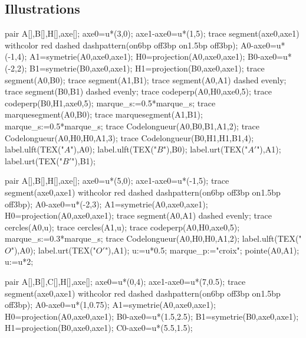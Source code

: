 \begin{changemargin}{0mm}{-15mm}
    \subsection{Illustrations}
    \begin{Geometrie}
        pair A[],B[],H[],axe[];
        axe0=u*(3,0);
        axe1-axe0=u*(1,5);
        trace segment(axe0,axe1) withcolor red dashed dashpattern(on6bp off3bp on1.5bp off3bp);
        A0-axe0=u*(-1,4);
        A1=symetrie(A0,axe0,axe1);
        H0=projection(A0,axe0,axe1);
        B0-axe0=u*(-2,2);
        B1=symetrie(B0,axe0,axe1);
        H1=projection(B0,axe0,axe1);
        trace segment(A0,B0);
        trace segment(A1,B1);
        trace segment(A0,A1) dashed evenly;
        trace segment(B0,B1) dashed evenly;
        trace codeperp(A0,H0,axe0,5);
        trace codeperp(B0,H1,axe0,5);
        marque_s:=0.5*marque_s;
        trace marquesegment(A0,B0);
        trace marquesegment(A1,B1);        
        marque_s:=0.5*marque_s;
        trace Codelongueur(A0,B0,B1,A1,2);
        trace Codelongueur(A0,H0,H0,A1,3);
        trace Codelongueur(B0,H1,H1,B1,4);
        label.ulft(TEX("$A$"),A0);
        label.ulft(TEX("$B$"),B0);
        label.urt(TEX("$A'$"),A1);
        label.urt(TEX("$B'$"),B1);
    \end{Geometrie}
    \hfill
    \begin{Geometrie}
        pair A[],B[],H[],axe[];
        axe0=u*(5,0);
        axe1-axe0=u*(-1,5);
        trace segment(axe0,axe1) withcolor red dashed dashpattern(on6bp off3bp on1.5bp off3bp);
        A0-axe0=u*(-2,3);
        A1=symetrie(A0,axe0,axe1);
        H0=projection(A0,axe0,axe1);        
        trace segment(A0,A1) dashed evenly;        
        trace cercles(A0,u);
        trace cercles(A1,u);
        trace codeperp(A0,H0,axe0,5);
        marque_s:=0.3*marque_s;
        trace Codelongueur(A0,H0,H0,A1,2);
        label.ulft(TEX("$O$"),A0);
        label.urt(TEX("$O'$"),A1);
        u:=u*0.5;
        marque_p:="croix";
        pointe(A0,A1);
        u:=u*2;
    \end{Geometrie}
    \hfill
    \begin{Geometrie}
        pair A[],B[],C[],H[],axe[];
        axe0=u*(0,4);
        axe1-axe0=u*(7,0.5);
        trace segment(axe0,axe1) withcolor red dashed dashpattern(on6bp off3bp on1.5bp off3bp);
        A0-axe0=u*(1,0.75);
        A1=symetrie(A0,axe0,axe1);
        H0=projection(A0,axe0,axe1);
        B0-axe0=u*(1.5,2.5);
        B1=symetrie(B0,axe0,axe1);
        H1=projection(B0,axe0,axe1);
        C0-axe0=u*(5.5,1.5);

\end{Geometrie}
\end{changemargin}
